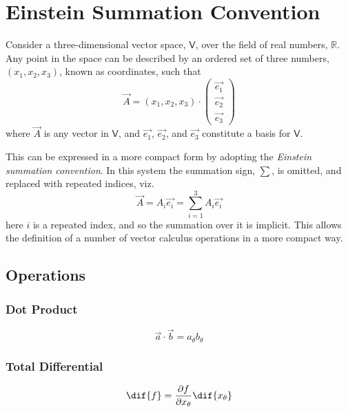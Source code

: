 \section{Einstein Summation Convention}
\label{sec:einsteinsummation}

Consider a three-dimensional vector space, $\mathsf{V}$, over the
field of real numbers, $\mathbb{R}$.  Any point in the space can be
described by an ordered set of three numbers, $(x_1, x_2, x_3)$, known
as coordinates, such that
\[ \vec{A} = (x_1, x_2, x_3) \cdot
\begin{pmatrix} \vec{e_1} \\ \vec {e_2} \\ \vec{e_3}
\end{pmatrix}
\]
where $\vec{A}$ is any vector in $\mathsf{V}$, and $\vec{e_1}$, $\vec
{e_2}$, and $\vec{e_3}$ constitute a basis for $\mathsf{V}$.

This can be expressed in a more compact form by adopting the {\em
  Einstein summation convention}. In this system the summation sign,
$\sum$, is omitted, and replaced with repeated indices, viz.
\[ \vec{A} = A_i \vec{e_i} = \sum_{i=1}^3 A_i\vec{e_i} \] here $i$ is
a repeated index, and so the summation over it is implicit.  This
allows the definition of a number of vector calculus operations in a
more compact way.

\subsection{Operations}
\label{sec:operations}


\subsubsection{Dot Product}
\label{sec:dotproduct}

\begin{equation}
  \label{eq:dotprod}
  \vec{a} \cdot \vec{b} = a_\theta b_\theta
\end{equation}

\subsubsection{Total Differential}
\label{sec:totaldiff}

\begin{equation}
  \label{eq:totaldifferential}
  \dif{f} = \frac{\partial f}{\partial x_\theta} \dif{x_\theta}
\end{equation}

